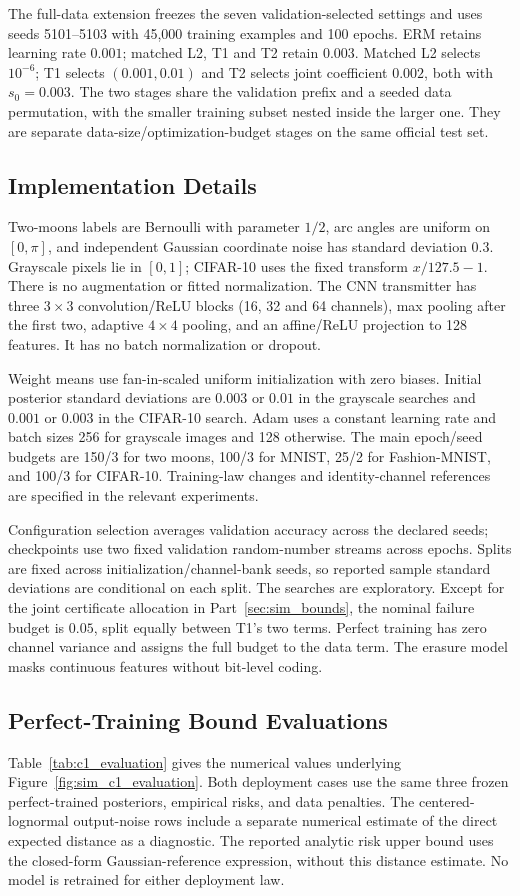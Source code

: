 The full-data extension freezes the seven validation-selected settings
and uses seeds 5101--5103 with 45,000 training examples and 100 epochs.
ERM retains learning rate $0.001$; matched L2, T1 and T2 retain $0.003$.
Matched L2 selects $10^{-6}$; T1 selects $(0.001,0.01)$ and T2 selects
joint coefficient $0.002$, both with $s_0=0.003$. The two stages share
the validation prefix and a seeded data permutation, with the smaller
training subset nested inside the larger one. They are separate
data-size/optimization-budget stages on the same official test set.

\subsection{Implementation Details}
\label{app:sim_implementation}
Two-moons labels are Bernoulli with parameter $1/2$, arc angles are
uniform on $[0,\pi]$, and independent Gaussian coordinate noise has
standard deviation $0.3$. Grayscale pixels lie in $[0,1]$; CIFAR-10 uses
the fixed transform $x/127.5-1$. There is no augmentation or fitted
normalization. The CNN transmitter has three $3\times3$
convolution/ReLU blocks (16, 32 and 64 channels), max pooling after the
first two, adaptive $4\times4$ pooling, and an affine/ReLU projection
to 128 features. It has no batch normalization or dropout.

Weight means use fan-in-scaled uniform initialization with zero biases.
Initial posterior standard deviations are $0.003$ or $0.01$ in the
grayscale searches and $0.001$ or $0.003$ in the CIFAR-10 search.
Adam uses a constant learning rate and batch sizes 256 for grayscale
images and 128 otherwise. The main epoch/seed budgets are 150/3 for
two moons, 100/3 for MNIST, 25/2 for Fashion-MNIST, and 100/3 for CIFAR-10.
Training-law changes and identity-channel references are specified in
the relevant experiments.

Configuration selection averages validation accuracy across the declared
seeds; checkpoints use two fixed validation random-number streams across
epochs. Splits are fixed across initialization/channel-bank seeds, so
reported sample standard deviations are conditional on each split.
The searches are exploratory. Except for the joint certificate allocation
in Part~\ref{sec:sim_bounds}, the nominal failure budget is $0.05$, split
equally between T1's two terms. Perfect training has zero channel variance
and assigns the full budget to the data term.
The erasure model masks continuous features without bit-level coding.

\subsection{Perfect-Training Bound Evaluations}
Table~\ref{tab:c1_evaluation} gives the numerical values underlying
Figure~\ref{fig:sim_c1_evaluation}. Both deployment cases use the same
three frozen perfect-trained posteriors, empirical risks, and data penalties.
The centered-lognormal output-noise rows include a separate numerical estimate
of the direct expected distance as a diagnostic. The reported analytic risk
upper bound uses the closed-form Gaussian-reference expression, without this
distance estimate. No model is retrained for either deployment law.

